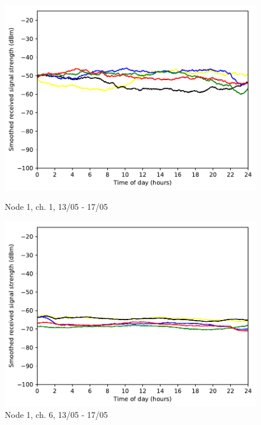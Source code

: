 \documentclass[a4paper, 11pt]{article}
\begin{document}
\begin{figure}
\begin{minipage}{0.47\textwidth}
    \centering
	\includegraphics[width=\textwidth]{images/2_4_GHz/node1_2017-05-17_chan1_image}
    \caption{Node 1, ch. 1, 13/05 - 17/05} \label{node1-1}
\end{minipage}\hfill
\begin{minipage}{0.47\textwidth}
    \centering
	\includegraphics[width=\textwidth]{images/2_4_GHz/node1_2017-05-17_chan6_image}
    \caption{Node 1, ch. 6, 13/05 - 17/05} \label{node1-6}
\end{minipage}\hfill
\begin{minipage}{0.47\textwidth}
    \centering

\end{minipage}
\end{figure}
\end{document}
